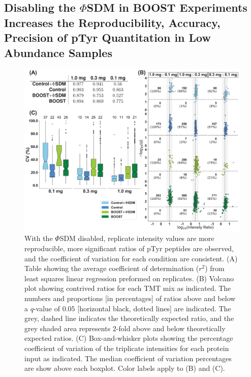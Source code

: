 \documentclass[journal=jprobs,manuscript=article]{achemso}
\begin{document}
\subsection{Disabling the $\Phi$SDM in BOOST Experiments Increases the Reproducibility, Accuracy, Precision of pTyr Quantitation in Low Abundance Samples}

\begin{figure}[!h]
\centering
\includegraphics[width=170mm]{figures/main_figs/accuracy_and_precision.pdf}
\caption{With the $\Phi$SDM disabled, replicate intensity values are more reproducible, more significant ratios of pTyr peptides are observed, and the coefficient of variation for each condition are consistent. (A) Table showing the average coefficient of determination ($r^{2}$) from least squares linear regression preformed on replicates. (B) Volcano plot showing contrived ratios for each TMT mix as indicated. The numbers and proportions [in percentages] of ratios above and below a $q$-value of $0.05$ [horizontal black, dotted lines] are indicated. The grey, dashed line indicates the theoretically expected ratio, and the grey shaded area represents $2$-fold above and below theoretically expected ratios. (C) Box-and-whisker plots showing the percentage coefficient of variation of the triplicate intensities for each protein input as indicated. The median coefficient of variation percentages are show above each boxplot. Color labels apply to (B) and (C).}\label{accuracy_and_precision}
\end{figure}
\end{document}
